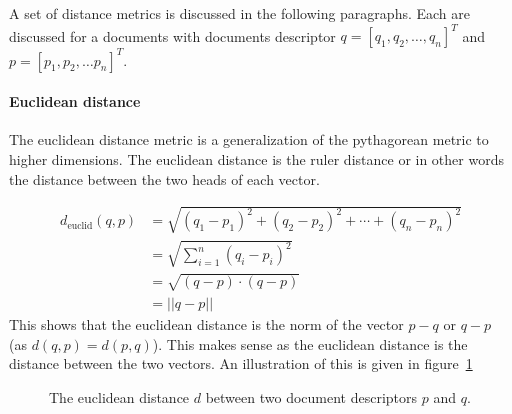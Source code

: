 A set of distance metrics is discussed in the following paragraphs. Each are
discussed for a documents with documents descriptor  $q = [q_1, q_2, \ldots,
q_n]^T$ and $p = [p_1, p_2, \ldots p_n]^T$.


\paragraph{Euclidean distance}
The euclidean distance metric is a generalization of the pythagorean metric to
higher dimensions. The euclidean distance is the ruler distance or in other 
words the distance between the two heads of each vector.

\begin{align*}
  d_{\text{euclid}}(q,p) &= \sqrt{(q_1 - p_1)^2 + (q_2 - p_2)^2 + \cdots + (q_n - p_n)^2}  \\
                         &= \sqrt{\sum_{i=1}^n (q_i - p_i)^2} \\
                         &= \sqrt {(q-p) \cdot (q-p)} \\
                         &= || q - p ||
\end{align*}
This shows that the euclidean distance is the norm of the vector $p-q$ or 
$q-p$ (as $d(q,p) = d(p,q)$). This makes sense as the euclidean distance
is the distance between the two vectors. An illustration of this is given in
figure~\ref{fig:euclid}

\begin{figure}[h!]
 \center

 \caption{The euclidean distance $d$ between two document descriptors $p$ and $q$.}
 \label{fig:euclid}
\end{figure}

